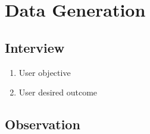 \section{Data Generation}
\subsection{Interview}

\begin{enumerate}
\item User objective
\item User desired outcome
\end{enumerate}


\subsection{Observation}

